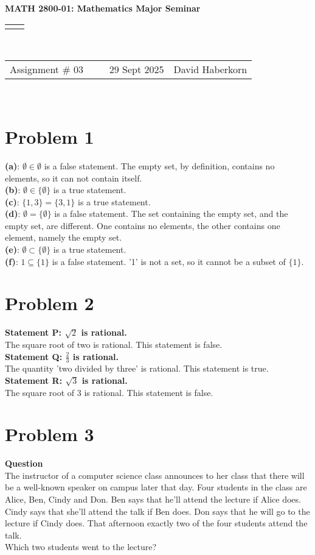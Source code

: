 \documentclass[11pt]{article}
\renewcommand{\title}[1]{\textbf{#1}\\}
\renewcommand{\line}{\begin{tabularx}{\textwidth}{X>{\raggedleft}X}\hline\\\end{tabularx}\\[-0.5cm]}
\newcommand{\leftright}[2]{\begin{tabularx}{\textwidth}{X>{\raggedleft}X}#1%
& #2\\\end{tabularx}\\[-0.5cm]}
\begin{document}
\title{MATH 2800-01: Mathematics Major Seminar}
\line
\leftright{Assignment \# 03 ~~~~ 29 Sept 2025}{David Haberkorn}


\section*{Problem 1}

 \textbf{(a)}: $\emptyset \in \emptyset$ is a false statement. The empty set, by definition, contains no elements, so it can not contain itself. \\
 \textbf{(b)}: $\emptyset \in \{\emptyset\}$ is a true statement. \\
 \textbf{(c)}: $ \{1, 3\} = \{3, 1\}$ is a true statement. \\
 \textbf{(d)}: $ \emptyset = \{\emptyset\} $ is a false statement. The set containing the empty set, and the empty set, are different. One contains no elements, the other contains one element, namely the empty set. \\
 \textbf{(e)}: $ \emptyset \subset \{\emptyset\} $ is a true statement. \\
 \textbf{(f)}: $ 1 \subseteq \{1\} $ is a false statement. '1' is not a set, so it cannot be a subset of $\{1\}$.\\


\newpage


\section*{Problem 2}

\textbf{Statement P: $\sqrt{2}$ is rational.}\\
The square root of two is rational. This statement is false.\\
\textbf{Statement Q: $\frac{2}{3}$ is rational.}\\
The quantity 'two divided by three' is rational. This statement is true. \\
\textbf{Statement R: $\sqrt{3}$ is rational.}\\
The square root of 3 is rational. This statement is false. \\


\newpage


\section*{Problem 3}

\textbf{Question}\\
The instructor of a computer science class announces to her class that there will be a well-known speaker on campus later that day. Four students in the class are Alice, Ben, Cindy and Don. Ben says that he’ll attend the lecture if Alice does. Cindy says that she’ll attend the talk if Ben does. Don says that he will go to the lecture if Cindy does. That afternoon exactly two of the four students attend the talk.\\
Which two students went to the lecture?\\
\end{document}
